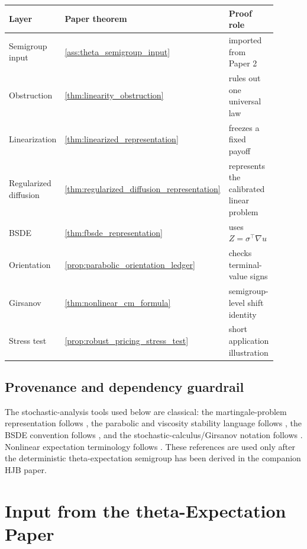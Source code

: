 \documentclass[11pt]{amsart}
\theoremstyle{definition}
\theoremstyle{remark}
\begin{document}
\begin{center}
\small
\begin{tabular}{p{0.24\linewidth}p{0.38\linewidth}p{0.28\linewidth}}
\hline
Layer & Paper theorem & Proof role \\
\hline
Semigroup input & \cref{ass:theta_semigroup_input} &
imported from Paper 2 \\
Obstruction & \cref{thm:linearity_obstruction} &
rules out one universal law \\
Linearization & \cref{thm:linearized_representation} &
freezes a fixed payoff \\
Regularized diffusion & \cref{thm:regularized_diffusion_representation} &
represents the calibrated linear problem \\
BSDE & \cref{thm:fbsde_representation} &
uses \(Z=\sigma^\top\nabla u\) \\
Orientation & \cref{prop:parabolic_orientation_ledger} &
checks terminal-value signs \\
Girsanov & \cref{thm:nonlinear_cm_formula} &
semigroup-level shift identity \\
Stress test & \cref{prop:robust_pricing_stress_test} &
short application illustration \\
\hline
\end{tabular}
\end{center}

\subsection{Provenance and dependency guardrail}

The stochastic-analysis tools used below are classical: the martingale-problem
representation follows \cite{stroock2007multidimensional}, the parabolic and
viscosity stability language follows
\cite{CrandallIshiiLions1992,FlemingSoner2006}, the BSDE convention follows
\cite{PardouxPeng1992}, and the stochastic-calculus/Girsanov notation follows
\cite{protter2012stochastic}.  Nonlinear expectation terminology follows
\cite{Peng2019}.  These references are used only after the deterministic
theta-expectation semigroup has been derived in the companion HJB paper.

\section{Input from the theta-Expectation Paper}
\end{document}
